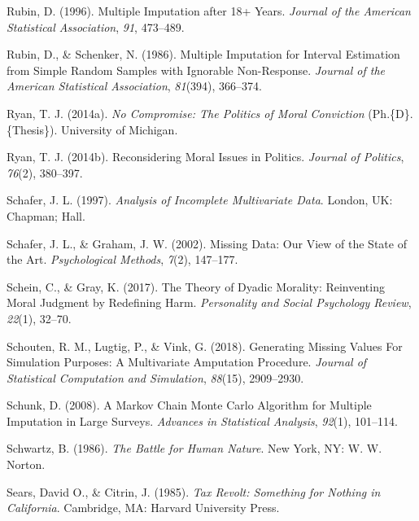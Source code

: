 \documentclass[12pt,econ]{sources/authesis}
\newenvironment{CSLReferences}%
  {}%
  {\par}
\begin{document}
\begin{CSLReferences}{1}{0}
\leavevmode{}%
Rubin, D. (1996). {Multiple Imputation after 18+ Years}. \emph{Journal of the American Statistical Association}, \emph{91}, 473--489.

\leavevmode{}%
Rubin, D., \& Schenker, N. (1986). {Multiple Imputation for Interval Estimation from Simple Random Samples with Ignorable Non-Response}. \emph{Journal of the American Statistical Association}, \emph{81}(394), 366--374.

\leavevmode{}%
Ryan, T. J. (2014a). \emph{No {Compromise}: {The} {Politics} of {Moral} {Conviction}} (Ph.\{D\}. \{Thesis\}). University of Michigan.

\leavevmode{}%
Ryan, T. J. (2014b). Reconsidering {Moral} {Issues} in {Politics}. \emph{Journal of Politics}, \emph{76}(2), 380--397.

\leavevmode{}%
Schafer, J. L. (1997). \emph{{Analysis of Incomplete Multivariate Data}}. London, UK: Chapman; Hall.

\leavevmode{}%
Schafer, J. L., \& Graham, J. W. (2002). {Missing Data: Our View of the State of the Art}. \emph{Psychological Methods}, \emph{7}(2), 147--177.

\leavevmode{}%
Schein, C., \& Gray, K. (2017). {The Theory of Dyadic Morality: Reinventing Moral Judgment by Redefining Harm}. \emph{Personality and Social Psychology Review}, \emph{22}(1), 32--70.

\leavevmode{}%
Schouten, R. M., Lugtig, P., \& Vink, G. (2018). {Generating Missing Values For Simulation Purposes: A Multivariate Amputation Procedure}. \emph{Journal of Statistical Computation and Simulation}, \emph{88}(15), 2909--2930.

\leavevmode{}%
Schunk, D. (2008). {A Markov Chain Monte Carlo Algorithm for Multiple Imputation in Large Surveys}. \emph{Advances in Statistical Analysis}, \emph{92}(1), 101--114.

\leavevmode{}%
Schwartz, B. (1986). \emph{The {Battle} for {Human} {Nature}}. New York, NY: W. W. Norton.

\leavevmode{}%
Sears, David O., \& Citrin, J. (1985). \emph{Tax {Revolt}: {Something} for {Nothing} in {California}}. Cambridge, MA: Harvard University Press.


\end{CSLReferences}
\end{document}
